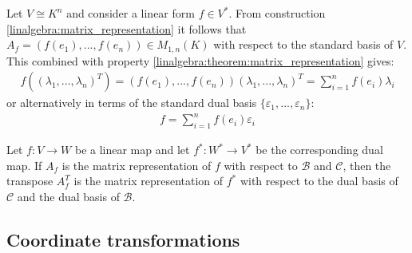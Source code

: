         \begin{formula}
		Let $V \cong K^n$ and consider a linear form $f\in V^*$. From construction \ref{linalgebra:matrix_representation} it follows that $A_f = (f(e_1), ..., f(e_n))\in M_{1,n}(K)$ with respect to the standard basis of $V$. This combined with property \ref{linalgebra:theorem:matrix_representation} gives:
	        \begin{gather}
			f\left((\lambda_1, ..., \lambda_n)^T\right) = (f(e_1), ..., f(e_n))(\lambda_1, ..., \lambda_n)^T = \sum_{i=1}^nf(e_i)\lambda_i
		\end{gather}
        	or alternatively in terms of the standard dual basis $\{\varepsilon_1, ..., \varepsilon_n\}$:
	        \begin{gather}
        	    	\label{linalgebra:map_in_function_of_dual_basis}
			f = \sum_{i=1}^nf(e_i)\varepsilon_i
		\end{gather}
	\end{formula}

        \begin{property}
		Let $f:V\rightarrow W$ be a linear map and let $f^*:W^*\rightarrow V^*$ be the corresponding dual map. If $A_f$ is the matrix representation of $f$ with respect to $\mathcal{B}$ and $\mathcal{C}$, then the transpose $A_f^T$ is the matrix representation of $f^*$ with respect to the dual basis of $\mathcal{C}$ and the dual basis of $\mathcal{B}$.
	\end{property}

\subsection{Coordinate transformations}


